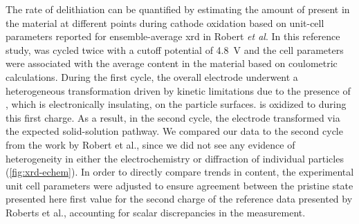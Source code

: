 \documentclass{article}
\begin{document}
The rate of delithiation can be quantified by estimating the amount of
 present in the material at different points during cathode
oxidation based on unit-cell parameters reported for ensemble-average
\gls{xrd} in Robert \emph{et al}\cite{robert2015}. In this reference
study, \nca{} was cycled twice with a cutoff potential of
\SI{4.8}{\volt} and the cell parameters were associated with the
average  content in the material based on coulometric
calculations. During the first cycle, the overall \nca{} electrode
underwent a heterogeneous transformation driven by kinetic limitations
due to the presence of , which is electronically
insulating, on the particle surfaces.  is oxidized to
 during this first charge. As a result, in the second cycle,
the electrode transformed via the expected solid-solution pathway. We
compared our data to the second cycle from the work by Robert et al.,
since we did not see any evidence of heterogeneity in either the
electrochemistry or diffraction of individual particles
(\ref{fig:xrd-echem}). In order to directly compare trends in 
content, the experimental unit cell parameters were adjusted to ensure
agreement between the pristine state presented here first value for
the second charge of the reference data presented by Roberts et al.,
accounting for scalar discrepancies in the measurement.
\end{document}
